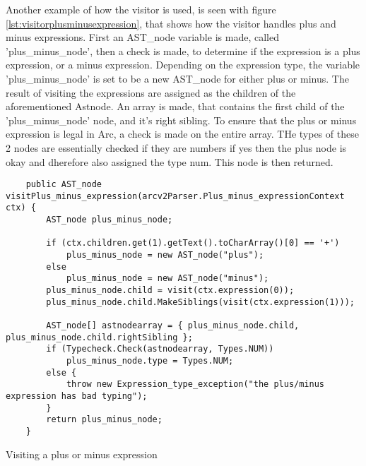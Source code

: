 Another example of how the visitor is used, is seen with figure \ref{lst:visitorplusminusexpression}, that shows how the visitor handles plus and minus expressions. First an AST\_node variable is made, called 'plus\_minus\_node', then a check is made, to determine if the expression is a plus expression, or a minus expression. Depending on the expression type, the variable 'plus\_minus\_node' is set to be a new AST\_node for either plus or minus. The result of visiting the expressions are assigned as the children of the aforementioned Astnode. An array is made, that contains the first child of the 'plus\_minus\_node' node, and it's right sibling. To ensure that the plus or minus expression is legal in Arc, a check is made on the entire array. THe types of these 2 nodes are essentially checked if they are numbers if yes then the plus node is okay and dherefore also assigned the type num. This node is then returned.

\begin{listing}[htb!]
    \begin{verbatim}
    public AST_node visitPlus_minus_expression(arcv2Parser.Plus_minus_expressionContext ctx) {
        AST_node plus_minus_node;

        if (ctx.children.get(1).getText().toCharArray()[0] == '+')
            plus_minus_node = new AST_node("plus");
        else
            plus_minus_node = new AST_node("minus");
        plus_minus_node.child = visit(ctx.expression(0));
        plus_minus_node.child.MakeSiblings(visit(ctx.expression(1)));

        AST_node[] astnodearray = { plus_minus_node.child, plus_minus_node.child.rightSibling };
        if (Typecheck.Check(astnodearray, Types.NUM))
            plus_minus_node.type = Types.NUM;
        else {
            throw new Expression_type_exception("the plus/minus expression has bad typing");
        }
        return plus_minus_node;
    }
    \end{verbatim}
    \caption{Visiting a plus or minus expression}
    \label{lst:visitorplusminusexpression}
\end{listing}


        





